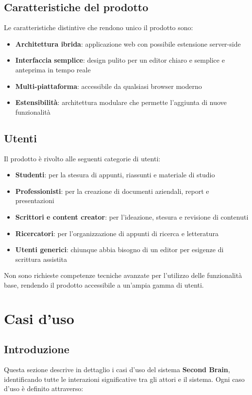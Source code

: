 \documentclass[11pt,a4paper]{article}
\begin{document}
\subsection{Caratteristiche del prodotto}
Le caratteristiche distintive che rendono unico il prodotto sono:

\begin{itemize}
    \item \textbf{Architettura ibrida}: applicazione web con possibile estensione server-side
    \item \textbf{Interfaccia semplice}: design pulito per un editor chiaro e semplice e anteprima in tempo reale
    \item \textbf{Multi-piattaforma}: accessibile da qualsiasi browser moderno
    \item \textbf{Estensibilità}: architettura modulare che permette l'aggiunta di nuove funzionalità
    
\end{itemize}

\subsection{Utenti}
Il prodotto è rivolto alle seguenti categorie di utenti:

\begin{itemize}
    \item \textbf{Studenti}: per la stesura di appunti, riassunti e materiale di studio
    \item \textbf{Professionisti}: per la creazione di documenti aziendali, report e presentazioni
    \item \textbf{Scrittori e content creator}: per l'ideazione, stesura e revisione di contenuti
    \item \textbf{Ricercatori}: per l'organizzazione di appunti di ricerca e letteratura
    \item \textbf{Utenti generici}: chiunque abbia bisogno di un editor per esigenze di scrittura assistita
\end{itemize}

Non sono richieste competenze tecniche avanzate per l'utilizzo delle funzionalità base, rendendo il prodotto accessibile a un'ampia gamma di utenti.

\newpage

\section{Casi d'uso}
\subsection{Introduzione}
Questa sezione descrive in dettaglio i casi d'uso del sistema \textbf{Second Brain}, identificando tutte le interazioni significative tra gli attori e il sistema. Ogni caso d'uso è definito attraverso:
\end{document}
